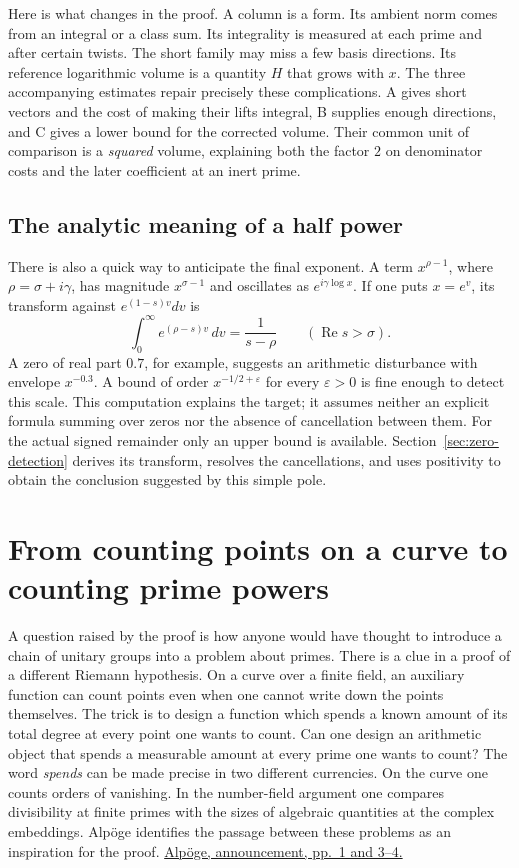 \documentclass[11pt,letterpaper]{article}
\renewcommand{\Re}{\operatorname{Re}}
\begin{document}
Here is what changes in the proof. A column is a form. Its ambient norm comes from an integral or a class sum. Its integrality is measured at each prime and after certain twists. The short family may miss a few basis directions. Its reference logarithmic volume is a quantity \(H\) that grows with \(x\). The three accompanying estimates repair precisely these complications. A gives short vectors and the cost of making their lifts integral, B supplies enough directions, and C gives a lower bound for the corrected volume. Their common unit of comparison is a \emph{squared} volume, explaining both the factor \(2\) on denominator costs and the later coefficient at an inert prime.

\subsection{The analytic meaning of a half power}
There is also a quick way to anticipate the final exponent. A term \(x^{\rho-1}\), where \(\rho=\sigma+i\gamma\), has magnitude \(x^{\sigma-1}\) and oscillates as \(e^{i\gamma\log x}\). If one puts \(x=e^v\), its transform against \(e^{(1-s)v}dv\) is
\[
     \int_0^\infty e^{(\rho-s)v}\,dv=\frac1{s-\rho}
          \qquad(\Re s>\sigma).
\]
A zero of real part \(0.7\), for example, suggests an arithmetic disturbance with envelope \(x^{-0.3}\). A bound of order \(x^{-1/2+\varepsilon}\) for every \(\varepsilon>0\) is fine enough to detect this scale. This computation explains the target; it assumes neither an explicit formula summing over zeros nor the absence of cancellation between them. For the actual signed remainder only an upper bound is available. Section~\ref{sec:zero-detection} derives its transform, resolves the cancellations, and uses positivity to obtain the conclusion suggested by this simple pole.

\section{From counting points on a curve to counting prime powers}
\label{sec:discovery}

A question raised by the proof is how anyone would have thought to introduce a chain of unitary groups into a problem about primes. There is a clue in a proof of a different Riemann hypothesis. On a curve over a finite field, an auxiliary function can count points even when one cannot write down the points themselves. The trick is to design a function which spends a known amount of its total degree at every point one wants to count. Can one design an arithmetic object that spends a measurable amount at every prime one wants to count? The word \emph{spends} can be made precise in two different currencies. On the curve one counts orders of vanishing. In the number-field argument one compares divisibility at finite primes with the sizes of algebraic quantities at the complex embeddings. Alpöge identifies the passage between these problems as an inspiration for the proof. \href{https://alpo.ge/remark.pdf}{Alpöge, announcement, pp.~1 and 3--4.}
\end{document}
